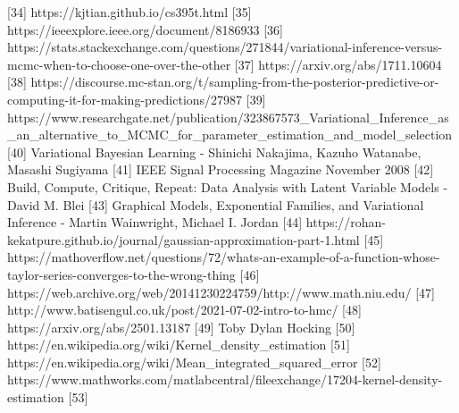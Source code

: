 [34] https://kjtian.github.io/cs395t.html
[35] https://ieeexplore.ieee.org/document/8186933
[36] https://stats.stackexchange.com/questions/271844/variational-inference-versus-mcmc-when-to-choose-one-over-the-other
[37] https://arxiv.org/abs/1711.10604
[38] https://discourse.mc-stan.org/t/sampling-from-the-posterior-predictive-or-computing-it-for-making-predictions/27987
[39] https://www.researchgate.net/publication/323867573_Variational_Inference_as_an_alternative_to_MCMC_for_parameter_estimation_and_model_selection
[40] Variational Bayesian Learning - Shinichi Nakajima, Kazuho Watanabe, Masashi Sugiyama
[41] IEEE Signal Processing Magazine November 2008
[42] Build, Compute, Critique, Repeat: Data Analysis with Latent Variable Models - David M. Blei
[43] Graphical Models, Exponential Families, and Variational Inference - Martin Wainwright, Michael I. Jordan
[44] https://rohan-kekatpure.github.io/journal/gaussian-approximation-part-1.html
[45] https://mathoverflow.net/questions/72/whats-an-example-of-a-function-whose-taylor-series-converges-to-the-wrong-thing
[46] https://web.archive.org/web/20141230224759/http://www.math.niu.edu/%
[47] http://www.batisengul.co.uk/post/2021-07-02-intro-to-hmc/
[48] https://arxiv.org/abs/2501.13187
[49] Toby Dylan Hocking
[50] https://en.wikipedia.org/wiki/Kernel_density_estimation
[51] https://en.wikipedia.org/wiki/Mean_integrated_squared_error
[52] https://www.mathworks.com/matlabcentral/fileexchange/17204-kernel-density-estimation
[53] 